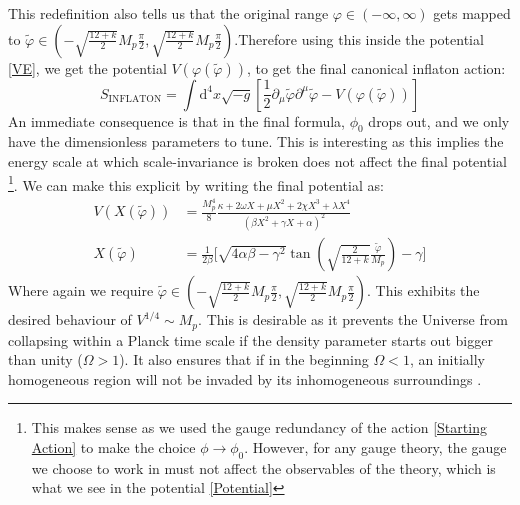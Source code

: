 \documentclass[aps,prd,reprint,preprintnumbers,showpacs,floatfix,nofootinbib,superscript address]{revtex4-2}
\newcommand{\wb}[1]{{\color[RGB]{255,0,0}{\textbf{\textit{[WB: #1]}}}}}
\begin{document}
This redefinition also tells us that the original range $\varphi \in (-\infty,\infty)$ gets mapped to $\tilde{\varphi} \in \left( -\sqrt{\frac{12 + k}{2}}M_p \frac{\pi}{2},\sqrt{\frac{12 + k}{2}}M_p \frac{\pi}{2} \right)$.Therefore using this inside the potential \cref{VE}, we get the potential $V(\varphi(\tilde{\varphi}))$, to get the final canonical inflaton action:
\begin{equation}
    S_{\text{INFLATON}} = \int \text{d}^4x \sqrt{-g} \left[ \frac{1}{2}\partial_\mu \tilde{\varphi}\partial^\mu \tilde{\varphi} - V(\varphi(\tilde{\varphi})) \right]
\end{equation}
An immediate consequence is that in the final formula, $\phi_0$ drops out, and we only have the dimensionless parameters to tune. This is interesting as this implies the energy scale at which scale-invariance is broken does not affect the final potential \footnote{This makes sense as we used the gauge redundancy of the action \cref{Starting Action} to make the choice $\phi \rightarrow \phi_0$. However, for any gauge theory, the gauge we choose to work in must not affect the observables of the theory, which is what we see in the potential \cref{Potential}}. We can make this explicit by writing the final potential as:
\begin{align}
    V(X(\tilde{\varphi})) &=  \frac{M_p^4}{8}  \frac{ \kappa + 2\omega X +\mu X^2 + 2\chi X^3 + \lambda X^4 }{(\beta X^2 + \gamma X + \alpha )^2} \label{Potential} \\
    X(\tilde{\varphi}) &= \frac{1}{2\beta} \Biggl[ \sqrt{4\alpha\beta - \gamma^2} \tan\left(\sqrt{\frac{2}{12+k}}\frac{\tilde{\varphi}}{M_p}\right) - \gamma \Biggr]  \label{X}
\end{align}
Where again we require $\tilde{\varphi} \in \left( -\sqrt{\frac{12 + k}{2}}M_p \frac{\pi}{2},\sqrt{\frac{12 + k}{2}}M_p \frac{\pi}{2} \right)$. This exhibits the desired behaviour of $V^{1/4} \sim M_p$. This is desirable as it prevents the Universe from collapsing within a Planck time scale if the density parameter starts out bigger than unity ($\Omega > 1$). It also ensures that if in the beginning $\Omega < 1$, an initially homogeneous region will not be invaded by its inhomogeneous surroundings \cite{Liddle_Lyth_2000}.  \wb{Interesting!}
\end{document}

